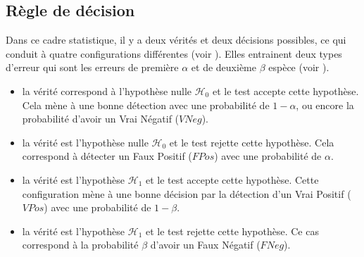 \subsection{Règle de décision}
Dans ce cadre statistique, il y a deux vérités et deux décisions possibles, ce qui conduit à quatre configurations différentes (voir ).
Elles entrainent deux types d'erreur qui sont les erreurs de première $\alpha$ et de deuxième $\beta$ espèce (voir ).\\
\begin{itemize}
    \item la vérité correspond à l'hypothèse nulle $\mathcal{H}_{0}$ et le test accepte cette hypothèse. 
    Cela mène à une bonne détection avec une probabilité de $1-\alpha$, ou encore la probabilité d'avoir un Vrai Négatif ($VNeg$).\\
    \item la vérité est l'hypothèse nulle $\mathcal{H}_{0}$ et le test rejette cette hypothèse.
    Cela correspond à détecter un Faux Positif ($FPos$) avec une probabilité de $\alpha$.\\
    \item la vérité est l'hypothèse $\mathcal{H}_{1}$ et le test accepte cette hypothèse.
    Cette configuration mène à une bonne décision par la détection d'un Vrai Positif ($VPos$) avec une probabilité de $1-\beta$.\\
    \item la vérité est l'hypothèse $\mathcal{H}_{1}$ et le test rejette cette hypothèse.
    Ce cas correspond à la probabilité $\beta$ d'avoir un Faux Négatif ($FNeg$).\\
\end{itemize}

